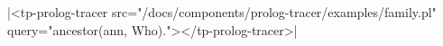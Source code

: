 \documentclass{article}
\begin{document}
\rawhtml|<tp-prolog-tracer src="/docs/components/prolog-tracer/examples/family.pl" query="ancestor(ann, Who)."></tp-prolog-tracer>|
\end{document}
